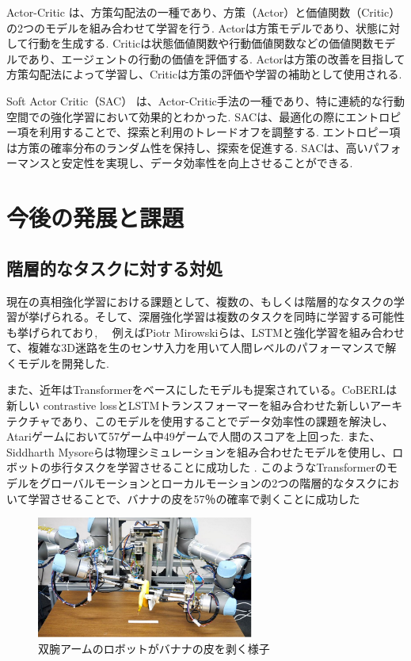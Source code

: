 \documentclass[a4j, twocolumn, 10pt,pdflatex,ja=standard]{bxjsarticle}
\begin{document}
Actor-Critic\cite{ac} は、方策勾配法の一種であり、方策（Actor）と価値関数（Critic）の2つのモデルを組み合わせて学習を行う. Actorは方策モデルであり、状態に対して行動を生成する. Criticは状態価値関数や行動価値関数などの価値関数モデルであり、エージェントの行動の価値を評価する. Actorは方策の改善を目指して方策勾配法によって学習し、Criticは方策の評価や学習の補助として使用される. 

Soft Actor Critic（SAC）\cite{sac} は、Actor-Critic手法の一種であり、特に連続的な行動空間での強化学習において効果的とわかった. SACは、最適化の際にエントロピー項を利用することで、探索と利用のトレードオフを調整する. エントロピー項は方策の確率分布のランダム性を保持し、探索を促進する. SACは、高いパフォーマンスと安定性を実現し、データ効率性を向上させることができる. 


\section{今後の発展と課題}

\subsection{階層的なタスクに対する対処}
現在の真相強化学習における課題として、複数の、もしくは階層的なタスクの学習が挙げられる。そして、深層強化学習は複数のタスクを同時に学習する可能性も挙げられており\cite{mujika},　 例えばPiotr Mirowskiらは、LSTMと強化学習を組み合わせて、複雑な3D迷路を生のセンサ入力を用いて人間レベルのパフォーマンスで解くモデルを開発した\cite{meiro}.

また、近年はTransformerをベースにしたモデルも提案されている。CoBERL\cite{coberl}は新しい contrastive lossとLSTMトランスフォーマーを組み合わせた新しいアーキテクチャであり、このモデルを使用することでデータ効率性の課題を解決し、Atariゲームにおいて57ゲーム中49ゲームで人間のスコアを上回った.  また、Siddharth Mysoreらは物理シミュレーションを組み合わせたモデルを使用し、ロボットの歩行タスクを学習させることに成功した \cite{regularizing}. このようなTransformerのモデルをグローバルモーションとローカルモーションの2つの階層的なタスクにおいて学習させることで、バナナの皮を57％の確率で剥くことに成功した\cite{banana}
\begin{figure}[htbp]
  \begin{center}
  \includegraphics[height=4cm]{./figure/banana.png}
  \caption{双腕アームのロボットがバナナの皮を剥く様子}
  \end{center}
 \end{figure}
\end{document}
